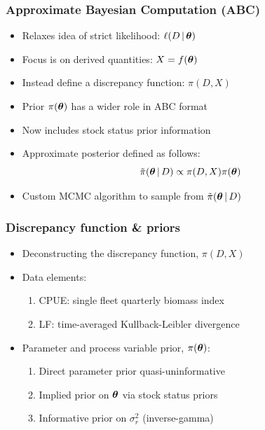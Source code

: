 \documentclass{beamer}
\newcommand{\ds}{\displaystyle}
\newcommand{\xtheta}{\mbox{\boldmath$\theta$}}
\newcommand{\sigr}{\sigma^2_r}
\begin{document}
\begin{frame}
    \frametitle{Approximate Bayesian Computation (ABC)}
\begin{itemize}
    \item Relaxes idea of strict likelihood: $\ell(D\,|\,\xtheta)$
    \item Focus is on derived quantities: $X=f(\xtheta)$
    \item Instead define a discrepancy function: $\pi(D,X)$
    \item Prior $\pi(\xtheta)$ has a wider role in ABC format
    \item Now includes stock status prior information
    \item Approximate posterior defined as follows:
        \begin{equation*}
            \ds \tilde\pi(\xtheta\,|\,D)\propto \pi(D,X)\pi(\xtheta)
        \end{equation*}
    \item Custom MCMC algorithm to sample from $\tilde\pi(\xtheta\,|\,D)$
\end{itemize}
\end{frame}
\begin{frame}
    \frametitle{Discrepancy function \& priors}
\begin{itemize}
    \item Deconstructing the discrepancy function, $\pi(D,X)$
    \item Data elements:
        \vspace{0.2cm}
        \begin{enumerate}
            \item CPUE: single fleet quarterly biomass index
            \item LF: time-averaged Kullback-Leibler divergence 
        \end{enumerate}
        \vspace{0.2cm}
    \item Parameter and process variable prior, $\pi(\xtheta)$:
        \vspace{0.2cm} 
        \begin{enumerate}
            \item Direct parameter prior quasi-uninformative
            \item Implied prior on $\xtheta$ via stock status priors
            \item Informative prior on $\sigr$ (inverse-gamma)
        \end{enumerate} 
\end{itemize}
\end{frame}
\end{document}
